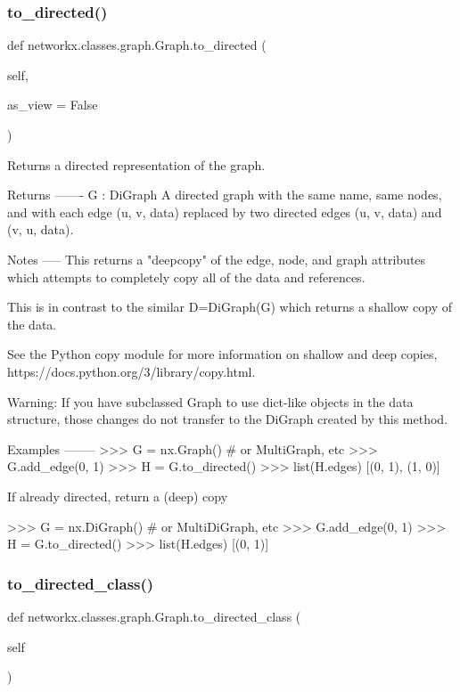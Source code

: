 \subsubsection{\texorpdfstring{to\+\_\+directed()}{to\_directed()}}
{\footnotesize\ttfamily def networkx.\+classes.\+graph.\+Graph.\+to\+\_\+directed (\begin{DoxyParamCaption}\item[{}]{self,  }\item[{}]{as\+\_\+view = {\ttfamily False} }\end{DoxyParamCaption})}

\begin{DoxyVerb}Returns a directed representation of the graph.

Returns
-------
G : DiGraph
    A directed graph with the same name, same nodes, and with
    each edge (u, v, data) replaced by two directed edges
    (u, v, data) and (v, u, data).

Notes
-----
This returns a "deepcopy" of the edge, node, and
graph attributes which attempts to completely copy
all of the data and references.

This is in contrast to the similar D=DiGraph(G) which returns a
shallow copy of the data.

See the Python copy module for more information on shallow
and deep copies, https://docs.python.org/3/library/copy.html.

Warning: If you have subclassed Graph to use dict-like objects
in the data structure, those changes do not transfer to the
DiGraph created by this method.

Examples
--------
>>> G = nx.Graph()  # or MultiGraph, etc
>>> G.add_edge(0, 1)
>>> H = G.to_directed()
>>> list(H.edges)
[(0, 1), (1, 0)]

If already directed, return a (deep) copy

>>> G = nx.DiGraph()  # or MultiDiGraph, etc
>>> G.add_edge(0, 1)
>>> H = G.to_directed()
>>> list(H.edges)
[(0, 1)]
\end{DoxyVerb}
 \mbox{\label{classnetworkx_1_1classes_1_1graph_1_1Graph_a1256a01c9fcf2ec6e7ad99cd4dd5ce7a}} 
\subsubsection{\texorpdfstring{to\+\_\+directed\+\_\+class()}{to\_directed\_class()}}
{\footnotesize\ttfamily def networkx.\+classes.\+graph.\+Graph.\+to\+\_\+directed\+\_\+class (\begin{DoxyParamCaption}\item[{}]{self }\end{DoxyParamCaption})}


